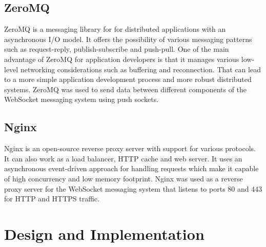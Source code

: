 \subsection{ZeroMQ}

ZeroMQ is a messaging library for for distributed applications with an asynchronous I/O model. It offers the possibility of various messaging patterns such as request-reply, publish-subscribe and push-pull. One of the main advantage of ZeroMQ for application developers is that it manages various low-level networking considerations such as buffering and reconnection. That can lead to a more simple application development process and more robust distributed systems. ZeroMQ was used to send data between different components of the WebSocket messaging system using push sockets.

\subsection{Nginx}

Nginx is an open-source reverse proxy server with support for various protocols. It can also work as a load balancer, HTTP cache and web server. It uses an asynchronous event-driven approach for handling requests which make it capable of high concurrency and low memory footprint. Nginx was used as a reverse proxy server for the WebSocket messaging system that listens to ports 80 and 443 for HTTP and HTTPS traffic.

\section{Design and Implementation}


